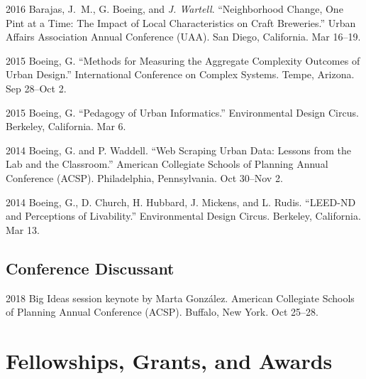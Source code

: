 \documentclass{academiccv}
\begin{document}
\begin{tablist}
\item[2016] \tab Barajas, J.~M., G. Boeing, and \textit{J. Wartell}. \enquote{Neighborhood Change, One Pint at a Time: The Impact of Local Characteristics on Craft Breweries.} Urban Affairs Association Annual Conference (UAA). San Diego, California. Mar 16--19.

\item[2015] \tab Boeing, G. \enquote{Methods for Measuring the Aggregate Complexity Outcomes of Urban Design.} International Conference on Complex Systems. Tempe, Arizona. Sep 28--Oct 2.

\item[2015] \tab Boeing, G. \enquote{Pedagogy of Urban Informatics.} Environmental Design Circus. Berkeley, California. Mar 6.

\item[2014] \tab Boeing, G. and P. Waddell. \enquote{Web Scraping Urban Data: Lessons from the Lab and the Classroom.} American Collegiate Schools of Planning Annual Conference (ACSP). Philadelphia, Pennsylvania. Oct 30--Nov 2.

\item[2014] \tab Boeing, G., D. Church, H. Hubbard, J. Mickens, and L. Rudis. \enquote{LEED-ND and Perceptions of Livability.} Environmental Design Circus. Berkeley, California. Mar 13.

\end{tablist}

\subsection*{Conference Discussant}

\begin{tablist}
	
	\item[2018] \tab Big Ideas session keynote by Marta González. American Collegiate Schools of Planning Annual Conference (ACSP). Buffalo, New York. Oct 25--28.
	
\end{tablist}



\section*{Fellowships, Grants, and Awards}
\end{document}
